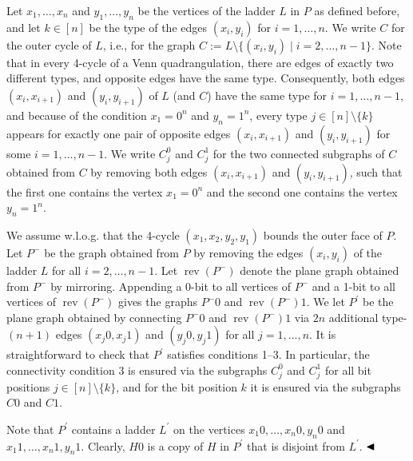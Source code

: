 \documentclass[10pt,a4paper]{article}
\begin{document}
Let $x_{1},\ldots,x_{n}$ and $y_{1},\ldots,y_{n}$ be the vertices of the ladder $L$ in $P$ as defined before, and let $k\in[n]$ be the type of the edges $(x_{i},y_{i})$ for $i=1,\ldots,n$. We write $C$ for the outer cycle of $L$, i.e., for the graph $C:=L\setminus\{(x_{i},y_{i})\mid i=2,\ldots,n-1\}$. Note that in every 4-cycle of a Venn quadrangulation, there are edges of exactly two different types, and opposite edges have the same type. Consequently, both edges $(x_{i},x_{i+1})$ and $(y_{i},y_{i+1})$ of $L$ (and $C$) have the same type for $i=1,\ldots,n-1$, and because of the condition $x_{1}=0^{n}$ and $y_{n}=1^{n}$, every type $j\in[n]\setminus\{k\}$ appears for exactly one pair of opposite edges $(x_{i},x_{i+1})$ and $(y_{i},y_{i+1})$ for some $i=1,\ldots,n-1$. We write $C_{j}^{0}$ and $C_{j}^{1}$ for the two connected subgraphs of $C$ obtained from $C$ by removing both edges $(x_{i},x_{i+1})$ and $(y_{i},y_{i+1})$, such that the first one contains the vertex $x_{1}=0^{n}$ and the second one contains the vertex $y_{n}=1^{n}$.
\par
\par
We assume w.l.o.g. that the 4-cycle $(x_{1},x_{2},y_{2},y_{1})$ bounds the outer face of $P$. Let $P^{-}$ be the graph obtained from $P$ by removing the edges $(x_{i},y_{i})$ of the ladder $L$ for all $i=2,\ldots,n-1$. Let $\operatorname{rev}(P^{-})$ denote the plane graph obtained from $P^{-}$ by mirroring. Appending a 0-bit to all vertices of $P^{-}$ and a 1-bit to all vertices of $\operatorname{rev}(P^{-})$ gives the graphs $P^{-}0$ and $\operatorname{rev}(P^{-})1$. We let $P^{\prime}$ be the plane graph obtained by connecting $P^{-}0$ and $\operatorname{rev}(P^{-})1$ via $2n$ additional type-$(n+1)$ edges $(x_{j}0,x_{j}1)$ and $(y_{j}0,y_{j}1)$ for all $j=1,\ldots,n$. It is straightforward to check that $P^{\prime}$ satisfies conditions 1–3. In particular, the connectivity condition 3 is ensured via the subgraphs $C_{j}^{0}$ and $C_{j}^{1}$ for all bit positions $j\in[n]\setminus\{k\}$, and for the bit position $k$ it is ensured via the subgraphs $C0$ and $C1$.
\par
\par
Note that $P^{\prime}$ contains a ladder $L^{\prime}$ on the vertices $x_{1}0,\ldots,x_{n}0,y_{n}0$ and $x_{1}1,\ldots,x_{n}1,y_{n}1$. Clearly, $H0$ is a copy of $H$ in $P^{\prime}$ that is disjoint from $L^{\prime}$. $\hfill\blacktriangleleft$
\par
\end{document}

